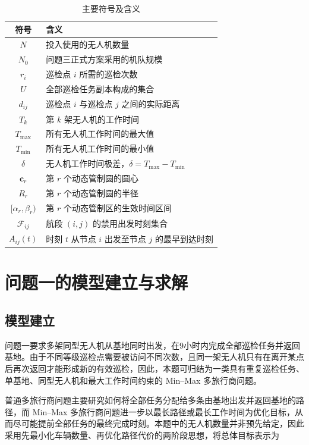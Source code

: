 \documentclass[UTF8,a4paper,12pt]{ctexart}
\numberwithin{equation}{section}
\numberwithin{equation}{section}
\begin{document}
\begin{table}[H]
  \centering
  \caption{主要符号及含义}
  \label{tab:main-symbols}
  \renewcommand{\arraystretch}{1.15}
  \begin{tabular}{c p{10.0cm}}
    \toprule
    符号 & 含义 \\
    \midrule
    $N$ & 投入使用的无人机数量 \\
    $N_0$ & 问题三正式方案采用的机队规模 \\
    $r_i$ & 巡检点 $i$ 所需的巡检次数 \\
    $U$ & 全部巡检任务副本构成的集合 \\
    $d_{ij}$ & 巡检点 $i$ 与巡检点 $j$ 之间的实际距离 \\
    $T_k$ & 第 $k$ 架无人机的工作时间 \\
    $T_{\max}$ & 所有无人机工作时间的最大值 \\
    $T_{\min}$ & 所有无人机工作时间的最小值 \\
    $\delta$ & 无人机工作时间极差，$\delta=T_{\max}-T_{\min}$ \\
    $\boldsymbol c_r$ & 第 $r$ 个动态管制圆的圆心 \\
    $R_r$ & 第 $r$ 个动态管制圆的半径 \\
    $[\alpha_r,\beta_r)$ & 第 $r$ 个动态管制区的生效时间区间 \\
    $\mathcal F_{ij}$ & 航段 $(i,j)$ 的禁用出发时刻集合 \\
    $A_{ij}(t)$ & 时刻 $t$ 从节点 $i$ 出发至节点 $j$ 的最早到达时刻 \\
    \bottomrule
  \end{tabular}
\end{table}

\section{问题一的模型建立与求解}

\subsection{模型建立}

问题一要求多架同型无人机从基地同时出发，在9小时内完成全部巡检任务并返回基地。由于不同等级巡检点需要被访问不同次数，且同一架无人机只有在离开某点后再次返回才能形成新的有效巡检，因此，本题可归结为一类具有重复巡检任务、单基地、同型无人机和最大工作时间约束的 Min--Max 多旅行商问题。

普通多旅行商问题主要研究如何将全部任务分配给多条由基地出发并返回基地的路径，而 Min--Max 多旅行商问题进一步以最长路径或最长工作时间为优化目标，从而尽可能提前全部任务的最终完成时刻\cite{guo2024}。本题中的无人机数量并非预先给定，因此采用先最小化车辆数量、再优化路径代价的两阶段思想\cite{bent2004,mouthuy2015}，将总体目标表示为
\end{document}
